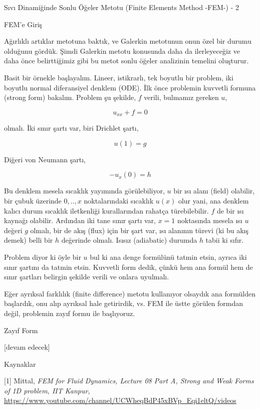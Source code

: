 \documentclass[12pt,fleqn]{article}\usepackage{../../common}
\begin{document}
Sıvı Dinamiğinde Sonlu Öğeler Metotu (Finite Elements Method -FEM-) - 2

FEM'e Giriş

Ağırlıklı artıklar metotuna baktık, ve Galerkin metotunun onun özel bir durumu
olduğunu gördük. Şimdi Galerkin metotu konusunda daha da ilerleyeceğiz ve daha
önce belirttiğimiz gibi bu metot sonlu öğeler analizinin temelini oluşturur.

Basit bir örnekle başlayalım. Lineer, istikrarlı, tek boyutlu bir problem, iki
boyutlu normal diferansiyel denklem (ODE). İlk önce problemin kuvvetli formuna
(strong form) bakalım. Problem şu şekilde, $f$ verili, bulmamız gereken $u$,

$$
u_{xx} + f = 0
$$

olmalı. İki sınır şartı var, biri Drichlet şartı,

$$
u(1) = g
$$

Diğeri von Neumann şartı,

$$
-u_{x}(0) = h
$$

Bu denklem mesela sıcaklık yayımında görülebiliyor, $u$ bir ısı alanı (field)
olabilir, bir çubuk üzerinde $0,..,x$ noktalarındaki sıcaklık $u(x)$ olur yani,
ana denklem kalıcı durum sıcaklık iletkenliği kurallarından rahatça
türebilebilir. $f$ de bir ısı kaynağı olabilir. Ardından iki tane sınır şartı
var, $x=1$ noktasında mesela ısı $u$ değeri $g$ olmalı, bir de akış (flux) için
bir şart var, ısı alanının türevi (ki bu akış demek) belli bir $h$ değerinde
olmalı. Isısız (adiabatic) durumda $h$ tabii ki sıfır.

Problem diyor ki öyle bir $u$ bul ki ana denge formülünü tatmin etsin, ayrıca
iki sınır şartını da tatmin etsin. Kuvvetli form dedik, çünkü hem ana formül hem
de sınır şartları belirgin şekilde verili ve onlara uyulmalı.

Eğer ayrıksal farklılık (finite difference) metotu kullanıyor olsaydık ana
formülden başlardık, onu alıp ayrıksal hale getirirdik, vs. FEM ile üstte
görülen formdan değil, problemin zayıf formu ile başlıyoruz.

Zayıf Form



[devam edecek]

Kaynaklar

[1] Mittal, {\em FEM for Fluid Dynamics, Lecture 08 Part A, Strong and Weak Forms of 1D problem, IIT Kanpur},
    \url{https://www.youtube.com/channel/UCWheqBdP45xBVp_Eqi1eltQ/videos}
\end{document}
